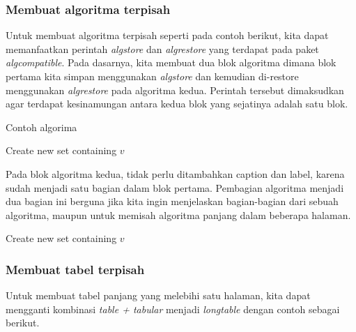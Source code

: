 \subsubsection{Membuat algoritma terpisah}

Untuk membuat algoritma terpisah seperti pada contoh berikut, kita dapat memanfaatkan perintah \textit{algstore} dan \textit{algrestore} yang terdapat pada paket \textit{algcompatible}. Pada dasarnya, kita membuat dua blok algoritma dimana blok pertama kita simpan menggunakan \textit{algstore} dan kemudian di-restore menggunakan \textit{algrestore} pada algoritma kedua. Perintah tersebut dimaksudkan agar terdapat kesinamungan antara kedua blok yang sejatinya adalah satu blok. 

\begin{algorithm}                     
	\caption{Contoh algorima}          
	\label{findme}                          
	\begin{algorithmic} [1]                   
		\State Create new set containing $v$
		\EndProcedure
	\end{algorithmic}
\end{algorithm}

Pada blok algoritma kedua, tidak perlu ditambahkan caption dan label, karena sudah menjadi satu bagian dalam blok pertama. Pembagian algoritma menjadi dua bagian ini berguna jika kita ingin menjelaskan bagian-bagian dari sebuah algoritma, maupun untuk memisah algoritma panjang dalam beberapa halaman.

\begin{algorithm}                     
	\begin{algorithmic} [1]                   
		\State Create new set containing $v$
		\EndProcedure
	\end{algorithmic}
\end{algorithm}


\subsubsection{Membuat tabel terpisah}

Untuk membuat tabel panjang yang melebihi satu halaman, kita dapat mengganti kombinasi \textit{table + tabular} menjadi \textit{longtable} dengan contoh sebagai berikut.

